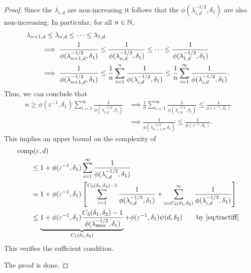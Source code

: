 \documentclass{article}
\theoremstyle{definition}
\begin{document}
\begin{proof}
Since the $\lambda_{i,d}$ are non-increasing it follows that the $\phi(\lambda_{i, d}^{-1/2},\delta_1)$ are also non-increasing.  In particular, for all $n \in \mathbb{N}$,
\begin{align*}
    \MoveEqLeft{\lambda_{n+1,d} \le \lambda_{n,d} \le \cdots \le \lambda_{1,d}} \\
    & \implies \frac{1}{\phi(\lambda_{n+1, d}^{-1/2},\delta_1)} \le \frac{1}{\phi(\lambda_{n, d}^{-1/2},\delta_1)} \le \cdots \le \frac{1}{\phi(\lambda_{1, d}^{-1/2},\delta_1)} \\
    & \implies \frac{1}{\phi(\lambda_{n+1, d}^{-1/2},\delta_1)} 
    \le \frac 1n \sum_{i=1}^n  \frac{1}{\phi(\lambda_{i, d}^{-1/2},\delta_1)} 
    \le \frac 1n \sum_{i=1}^\infty  \frac{1}{\phi(\lambda_{i, d}^{-1/2},\delta_1)}.
\end{align*}
Thus, we can conclude that 
\begin{align*}
    n \ge \phi(\varepsilon^{-1},\delta_1) \sum_{i=1}^\infty \frac{1}{\phi(\lambda_{i, d}^{-1/2},\delta_1)}
    & \implies 
  \frac 1n \sum_{i=1}^\infty \frac{1}{\phi(\lambda_{i, d}^{-1/2},\delta_1)} \le  \frac{1}{\phi(\varepsilon^{-1},\delta_1)} \\
   & \implies   \frac{1}{\phi(\lambda_{n+1, d}^{-1/2},\delta_1)} \le \frac{1}{\phi(\varepsilon^{-1},\delta_1)}.
\end{align*}
This implies an upper bound on the complexity of
\begin{align*}
       \MoveEqLeft{\comp(\varepsilon,d)} \\
       &\le 1 + \phi(\varepsilon^{-1},\delta_1) \sum_{i=1}^\infty \frac{1}{\phi(\lambda_{i, d}^{-1/2},\delta_1)} \\
       & = 1 + \phi(\varepsilon^{-1},\delta_1) \left [ \sum_{i=1}^{C_3(\delta_1,\delta_2)-1} \frac{1}{\phi(\lambda_{i, d}^{-1/2},\delta_1)}  + \sum_{i=C_3(\delta_1,\delta_2)}^\infty \frac{1}{\phi(\lambda_{i, d}^{-1/2},\delta_1)} \right ] \\
       & \le \underbrace{1+  \phi(\varepsilon^{-1},\delta_1) \frac{C_3(\delta_1,\delta_2)-1}{\phi(\lambda_{\max}^{-1/2},\delta_1)}}_{C_1(\delta_1,\delta_2)}
       +  \phi(\varepsilon^{-1},\delta_1) \psi(d,\delta_2) 
        \qquad \text{by \eqref{eq:tractiff}} \\
\end{align*}
This verifies the sufficient condition.



The proof is done.
\end{proof}
\end{document}
